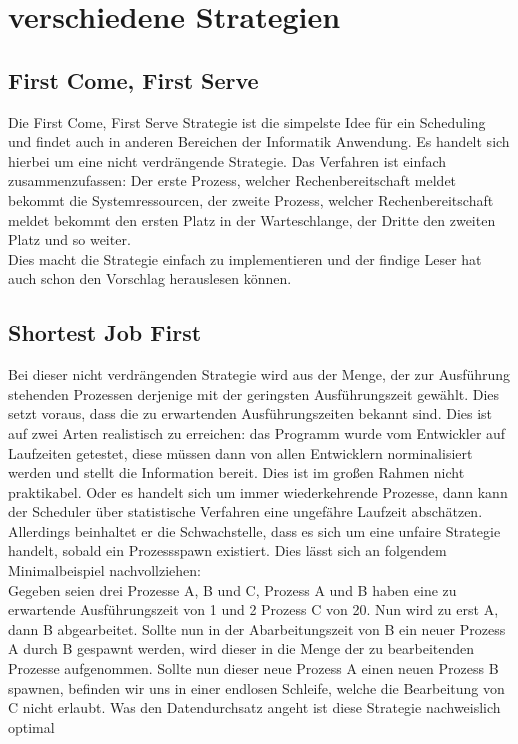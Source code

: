 \section{verschiedene Strategien}
\subsection{First Come, First Serve}
Die First Come, First Serve Strategie ist die simpelste Idee für ein Scheduling und findet auch in anderen Bereichen der Informatik Anwendung. Es handelt sich hierbei um eine nicht verdrängende Strategie.
Das Verfahren ist einfach zusammenzufassen: Der erste Prozess, welcher Rechenbereitschaft meldet bekommt die Systemressourcen, der zweite Prozess, welcher Rechenbereitschaft meldet bekommt den ersten Platz in der Warteschlange, der Dritte den zweiten Platz und so weiter. \\
Dies macht die Strategie einfach zu implementieren und der findige Leser hat auch schon den Vorschlag herauslesen können. 

\subsection{Shortest Job First}
Bei dieser nicht verdrängenden Strategie wird aus der Menge, der zur Ausführung stehenden Prozessen derjenige mit der geringsten Ausführungszeit gewählt. Dies setzt voraus, dass die zu erwartenden Ausführungszeiten bekannt sind. Dies ist auf zwei Arten realistisch zu erreichen: das Programm wurde vom Entwickler auf Laufzeiten getestet, diese müssen dann von allen Entwicklern norminalisiert werden und stellt die Information bereit. Dies ist im großen Rahmen nicht praktikabel. Oder es handelt sich um immer wiederkehrende Prozesse, dann kann der Scheduler über statistische Verfahren eine ungefähre Laufzeit abschätzen. \\
Allerdings beinhaltet er die Schwachstelle, dass es sich um eine unfaire Strategie handelt, sobald ein Prozessspawn existiert. Dies lässt sich an folgendem Minimalbeispiel nachvollziehen: \\
Gegeben seien drei Prozesse A, B und C, Prozess A und B haben eine zu erwartende Ausführungszeit von 1 und 2 Prozess C von 20. Nun wird zu erst A, dann B abgearbeitet. Sollte nun in der Abarbeitungszeit von B ein neuer Prozess A durch B gespawnt werden, wird dieser in die Menge der zu bearbeitenden Prozesse aufgenommen. Sollte nun dieser neue Prozess A einen neuen Prozess B spawnen, befinden wir uns in einer endlosen Schleife, welche die Bearbeitung von C nicht erlaubt.
Was den Datendurchsatz angeht ist diese Strategie nachweislich optimal \cite{tanenb2009}

